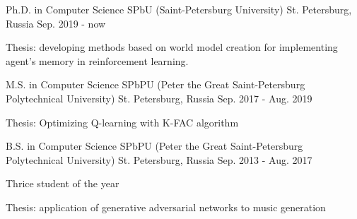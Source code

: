 

\begin{cventries}

  \cventry
	{Ph.D. in Computer Science} %
	{SPbU (Saint-Petersburg University)} %
	{St. Petersburg, Russia} %
	{Sep. 2019 - now} %
	{
	  	\begin{cvitems} %
	  		\item {Thesis: developing methods based on world model creation for implementing agent's memory in reinforcement learning.}
	  	\end{cvitems}
	}
  
  \cventry
	{M.S. in Computer Science} %
	{SPbPU (Peter the Great Saint-Petersburg Polytechnical University)} %
	{St. Petersburg, Russia} %
	{Sep. 2017 - Aug. 2019} %
	{
	 	\begin{cvitems} %
	 		\item {Thesis: Optimizing Q-learning with K-FAC algorithm}
	 	\end{cvitems}
	}
    

  \cventry
	{B.S. in Computer Science} %
	{SPbPU (Peter the Great Saint-Petersburg Polytechnical University)} %
	{St. Petersburg, Russia} %
	{Sep. 2013 - Aug. 2017} %
	{
		\begin{cvitems} %
			\item {Thrice student of the year}
			\item {Thesis: application of generative adversarial networks to music generation}
		\end{cvitems}
	}

\end{cventries}
